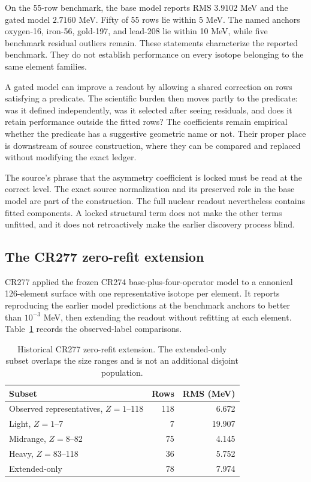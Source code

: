 On the 55-row benchmark, the base model reports RMS $3.9102$ MeV and the gated model $2.7160$ MeV. Fifty of 55 rows lie within 5 MeV. The named anchors oxygen-16, iron-56, gold-197, and lead-208 lie within 10 MeV, while five benchmark residual outliers remain. These statements characterize the reported benchmark. They do not establish performance on every isotope belonging to the same element families.

A gated model can improve a readout by allowing a shared correction on rows satisfying a predicate. The scientific burden then moves partly to the predicate: was it defined independently, was it selected after seeing residuals, and does it retain performance outside the fitted rows? The coefficients remain empirical whether the predicate has a suggestive geometric name or not. Their proper place is downstream of source construction, where they can be compared and replaced without modifying the exact ledger.

The source's phrase that the asymmetry coefficient is locked must be read at the correct level. The exact source normalization and its preserved role in the base model are part of the construction. The full nuclear readout nevertheless contains fitted components. A locked structural term does not make the other terms unfitted, and it does not retroactively make the earlier discovery process blind.

\subsection{The CR277 zero-refit extension}
\label{v2c5:cr277}

CR277 applied the frozen CR274 base-plus-four-operator model to a canonical 126-element surface with one representative isotope per element. It reports reproducing the earlier model predictions at the benchmark anchors to better than $10^{-3}$ MeV, then extending the readout without refitting at each element. Table~\ref{v2c5:extension} records the observed-label comparisons.\cite{viispine}

\begin{table}[tb]
\centering
\small
\begin{tabular}{lrr}
\hline
Subset & Rows & RMS (MeV)\\
\hline
Observed representatives, $Z=1$--118 & 118 & 6.672\\
Light, $Z=1$--7 & 7 & 19.907\\
Midrange, $Z=8$--82 & 75 & 4.145\\
Heavy, $Z=83$--118 & 36 & 5.752\\
Extended-only & 78 & 7.974\\
\hline
\end{tabular}
\caption{Historical CR277 zero-refit extension. The extended-only subset overlaps the size ranges and is not an additional disjoint population.}
\label{v2c5:extension}
\end{table}

